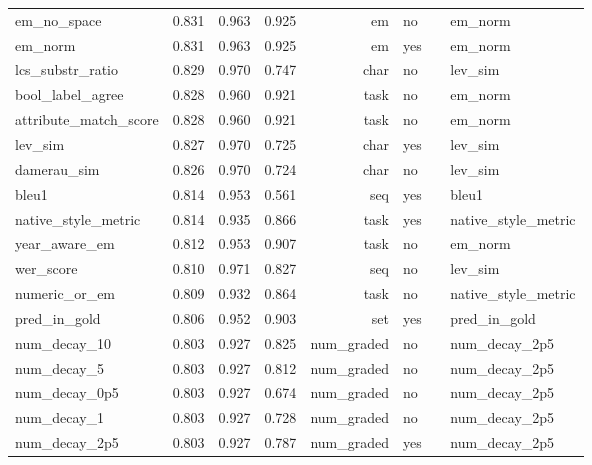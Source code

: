 \begin{longtable}{p{0.278\linewidth}rrrrp{0.134\linewidth}p{0.259\linewidth}}
em\_\allowbreak{}no\_\allowbreak{}space & 0.831 & 0.963 & 0.925 & em & no & em\_\allowbreak{}norm \\
em\_\allowbreak{}norm & 0.831 & 0.963 & 0.925 & em & yes & em\_\allowbreak{}norm \\
lcs\_\allowbreak{}substr\_\allowbreak{}ratio & 0.829 & 0.970 & 0.747 & char & no & lev\_\allowbreak{}sim \\
bool\_\allowbreak{}label\_\allowbreak{}agree & 0.828 & 0.960 & 0.921 & task & no & em\_\allowbreak{}norm \\
attribute\_\allowbreak{}match\_\allowbreak{}score & 0.828 & 0.960 & 0.921 & task & no & em\_\allowbreak{}norm \\
lev\_\allowbreak{}sim & 0.827 & 0.970 & 0.725 & char & yes & lev\_\allowbreak{}sim \\
damerau\_\allowbreak{}sim & 0.826 & 0.970 & 0.724 & char & no & lev\_\allowbreak{}sim \\
bleu1 & 0.814 & 0.953 & 0.561 & seq & yes & bleu1 \\
native\_\allowbreak{}style\_\allowbreak{}metric & 0.814 & 0.935 & 0.866 & task & yes & native\_\allowbreak{}style\_\allowbreak{}metric \\
year\_\allowbreak{}aware\_\allowbreak{}em & 0.812 & 0.953 & 0.907 & task & no & em\_\allowbreak{}norm \\
wer\_\allowbreak{}score & 0.810 & 0.971 & 0.827 & seq & no & lev\_\allowbreak{}sim \\
numeric\_\allowbreak{}or\_\allowbreak{}em & 0.809 & 0.932 & 0.864 & task & no & native\_\allowbreak{}style\_\allowbreak{}metric \\
pred\_\allowbreak{}in\_\allowbreak{}gold & 0.806 & 0.952 & 0.903 & set & yes & pred\_\allowbreak{}in\_\allowbreak{}gold \\
num\_\allowbreak{}decay\_\allowbreak{}10 & 0.803 & 0.927 & 0.825 & num\_\allowbreak{}graded & no & num\_\allowbreak{}decay\_\allowbreak{}2p5 \\
num\_\allowbreak{}decay\_\allowbreak{}5 & 0.803 & 0.927 & 0.812 & num\_\allowbreak{}graded & no & num\_\allowbreak{}decay\_\allowbreak{}2p5 \\
num\_\allowbreak{}decay\_\allowbreak{}0p5 & 0.803 & 0.927 & 0.674 & num\_\allowbreak{}graded & no & num\_\allowbreak{}decay\_\allowbreak{}2p5 \\
num\_\allowbreak{}decay\_\allowbreak{}1 & 0.803 & 0.927 & 0.728 & num\_\allowbreak{}graded & no & num\_\allowbreak{}decay\_\allowbreak{}2p5 \\
num\_\allowbreak{}decay\_\allowbreak{}2p5 & 0.803 & 0.927 & 0.787 & num\_\allowbreak{}graded & yes & num\_\allowbreak{}decay\_\allowbreak{}2p5 \\

\end{longtable}
